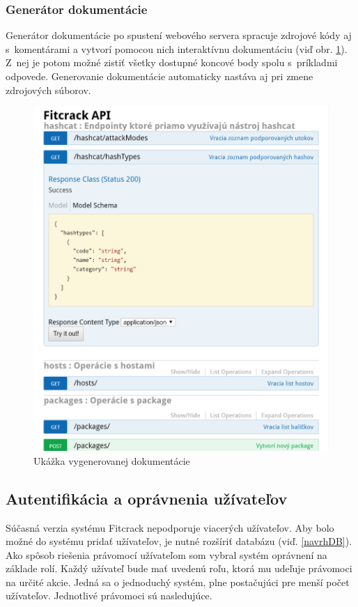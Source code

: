 \documentclass[slovak]{fitthesis}
\begin{document}
\subsubsection{Generátor dokumentácie}
Generátor dokumentácie po spustení webového servera spracuje zdrojové kódy aj s~komentárami a vytvorí pomocou nich interaktívnu dokumentáciu (viď obr. \ref{fig:doc}). Z~nej je potom možné zistiť všetky dostupné koncové body spolu s~príkladmi odpovede. Generovanie dokumentácie automaticky nastáva aj pri zmene zdrojových súborov.

\begin{figure}[H]
    \centering
    \includegraphics[scale=0.45]{obrazky/doc.PNG}
    \caption{Ukážka vygenerovanej dokumentácie}
    \label{fig:doc}
\end{figure}

\subsection{Autentifikácia a oprávnenia užívateľov}
Súčasná verzia systému Fitcrack nepodporuje viacerých užívateľov. Aby bolo možné do systému pridať užívateľov, je nutné rozšíriť databázu (viď. \ref{navrhDB}). Ako spôsob riešenia právomocí užívateľom som vybral systém oprávnení na základe rolí. Každý užívateľ bude mať uvedenú roľu, ktorá mu udeľuje právomoci na určité akcie. Jedná sa o jednoduchý systém, plne postačujúci pre menší počet užívateľov. Jednotlivé právomoci sú nasledujúce.
\end{document}
